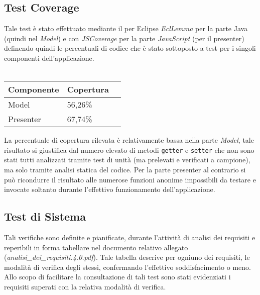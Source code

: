 \subsection{Test Coverage}
Tale test è stato effettuato mediante il \underline{} per Eclipse \textit{EclLemma} per la parte Java (quindi nel \textit{Model}) e con \textit{JSCoverage} per la parte \textit{JavaScript} (per il presenter) definendo quindi le percentuali di codice che è stato sottoposto a test per i singoli componenti dell'applicazione.\\\\

\begin{center}
\begin{longtable}{p{}ll}
\toprule Componente & Copertura\\
\midrule
Model & 56,26\%\\
Presenter & 67,74\% \\
\bottomrule
\end{longtable}
\end{center}

La percentuale di copertura rilevata è relativamente bassa nella parte \textit{Model}, tale risultato si giustifica dal numero elevato di metodi \texttt{getter} e \texttt{setter} che non sono stati tutti analizzati tramite test di unità (ma prelevati e verificati a campione), ma solo tramite analisi statica del codice. Per la parte presenter al contrario si può ricondurre il risultato alle numerose funzioni anonime impossibili da testare e invocate soltanto durante l'effettivo funzionamento dell'applicazione.

\clearpage
\subsection{Test di Sistema}
Tali verifiche sono definite e pianificate, durante l'attività di analisi dei requisiti e reperibili in forma tabellare nel documento relativo allegato (\textit{analisi\_dei\_requisiti.4.0.pdf}).
Tale tabella descrive per ogniuno dei requisiti, le modalità di verifica degli stessi, confermando l'effettivo soddisfacimento o meno. 
Allo scopo di facilitare la consultazione di tali test sono stati evidenziati i requisiti superati con la relativa modalità di verifica.

